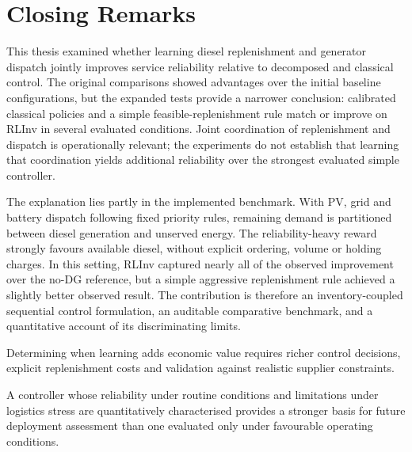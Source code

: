 \section{Closing Remarks}
\label{sec:conclusion_closing}

\begin{revisedblock}
This thesis examined whether learning diesel replenishment
and generator dispatch jointly improves service reliability
relative to decomposed and classical control. The original
comparisons showed advantages over the initial baseline
configurations, but the expanded tests provide a narrower
conclusion: calibrated classical policies and a simple
feasible-replenishment rule match or improve on RLInv in
several evaluated conditions. Joint coordination of
replenishment and dispatch is operationally relevant;
the experiments do not establish that learning that
coordination yields additional reliability over the
strongest evaluated simple controller.

The explanation lies partly in the implemented benchmark.
With PV, grid and battery dispatch following fixed
priority rules, remaining demand is partitioned between
diesel generation and unserved energy. The reliability-heavy
reward strongly favours available diesel, without explicit
ordering, volume or holding charges. In this setting,
RLInv captured nearly all of the observed improvement over
the no-DG reference, but a simple aggressive replenishment
rule achieved a slightly better observed result. The
contribution is therefore an inventory-coupled sequential
control formulation, an auditable comparative benchmark,
and a quantitative account of its discriminating limits.

Determining when learning adds economic value
requires richer control decisions, explicit
replenishment costs and validation against
realistic supplier constraints.

A controller whose reliability under routine
conditions and limitations under logistics
stress are quantitatively characterised
provides a stronger basis for future deployment
assessment than one evaluated only under
favourable operating conditions.
\end{revisedblock}

